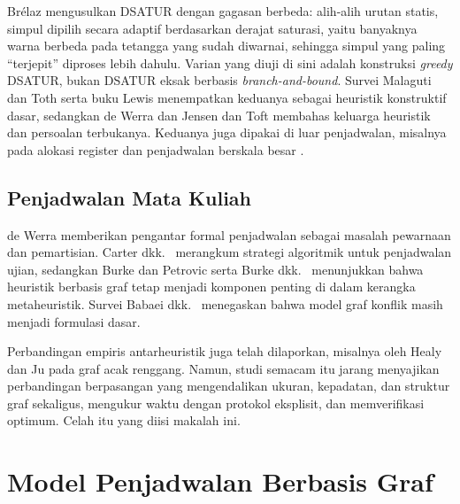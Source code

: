 \documentclass[conference,a4paper]{IEEEtran}
\begin{document}
Br\'elaz \cite{brelaz1979new} mengusulkan DSATUR dengan gagasan berbeda:
alih-alih urutan statis, simpul dipilih secara adaptif berdasarkan derajat
saturasi, yaitu banyaknya warna berbeda pada tetangga yang sudah diwarnai,
sehingga simpul yang paling ``terjepit'' diproses lebih dahulu. Varian yang
diuji di sini adalah konstruksi \emph{greedy} DSATUR, bukan DSATUR eksak
berbasis \emph{branch-and-bound}. Survei Malaguti dan Toth
\cite{malaguti2010survey} serta buku Lewis \cite{lewis2021guide} menempatkan
keduanya sebagai heuristik konstruktif dasar, sedangkan de Werra
\cite{dewerra1990heuristics} dan Jensen dan Toft \cite{jensen1995graph}
membahas keluarga heuristik dan persoalan terbukanya. Keduanya juga dipakai di
luar penjadwalan, misalnya pada alokasi register \cite{chaitin1982register} dan
penjadwalan berskala besar \cite{leighton1979graph}.

\subsection{Penjadwalan Mata Kuliah}
de Werra \cite{dewerra1985introduction} memberikan pengantar formal penjadwalan
sebagai masalah pewarnaan dan pemartisian. Carter dkk.\
\cite{carter1996examination} merangkum strategi algoritmik untuk penjadwalan
ujian, sedangkan Burke
dan Petrovic \cite{burke2002recent} serta Burke dkk.\ \cite{burke2007graph}
menunjukkan bahwa heuristik berbasis graf tetap menjadi komponen penting di
dalam kerangka metaheuristik. Survei Babaei dkk.\ \cite{babaei2015survey}
menegaskan bahwa model graf konflik masih menjadi formulasi dasar.

Perbandingan empiris antarheuristik juga telah dilaporkan, misalnya oleh Healy
dan Ju \cite{healy2014experimental} pada graf acak renggang. Namun, studi
semacam itu jarang menyajikan perbandingan berpasangan yang mengendalikan
ukuran, kepadatan, dan struktur graf sekaligus, mengukur waktu dengan protokol
eksplisit, dan memverifikasi optimum. Celah itu yang diisi makalah ini.

\section{Model Penjadwalan Berbasis Graf}
\label{sec:model}
\end{document}
